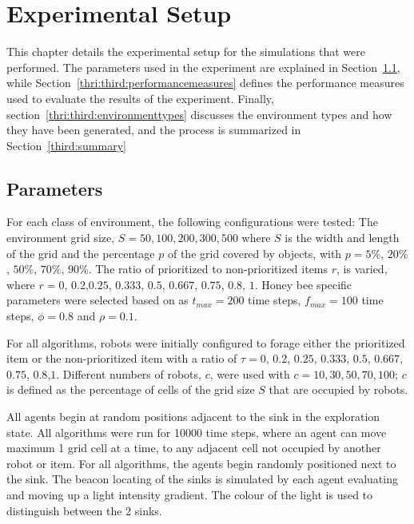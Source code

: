 
\chapter{Experimental Setup}
\label{chap:third}


This chapter details the experimental setup for the simulations that were performed. The parameters used in the experiment are explained in Section~\ref{parameters}, while Section~\ref{thri:third:performancemeasures} defines the performance measures used to evaluate the results of the experiment. Finally, section~\ref{thri:third:environmenttypes} discusses the environment types and how they have been generated, and the process is summarized in Section~\ref{third:summary}


\section{Parameters}
\label{parameters}

For each class of environment, the following configurations were tested: The environment grid size, $S=50,100,200,300, 500$ where $S$ is the width and length of the grid and the percentage $p$ of the grid covered by objects, with $p= 5\%$, $20\%$, $50\%$, $70\%$, $90\%$. The ratio of prioritized to non-prioritized items $r$, is varied, where $r=0$, $0.2$,$0.25$, $0.333$, $0.5$, $0.667$, $0.75$, $0.8$, $1$. Honey bee specific parameters were selected based on \cite{seeley2009wisdom} as 
$t_{max}=200$ time steps, $f_{max}=100$ time steps, $\phi=0.8$ and $\rho=0.1$.

For all algorithms, robots were initially configured to forage either the prioritized item or the non-prioritized item with a ratio of $\tau=0$, $0.2$, $0.25$, $0.333$, $0.5$, $0.667$, $0.75$, $0.8$,$1$. Different numbers of robots, $c$, were used with $c=10, 30, 50, 70, 100$; $c$ is defined as the percentage of cells of the grid size $S$ that are occupied by robots.

All agents begin at random positions adjacent to the sink in the exploration state. All algorithms were run for 10000 time steps, where an agent can move maximum 1 grid cell at a time, to any adjacent cell not occupied by another robot or item. For all algorithms, the agents begin randomly positioned next to the sink. The beacon locating of the sinks is simulated by each agent evaluating and moving up a light intensity gradient. The colour of the light is used to distinguish between the 2 sinks.

